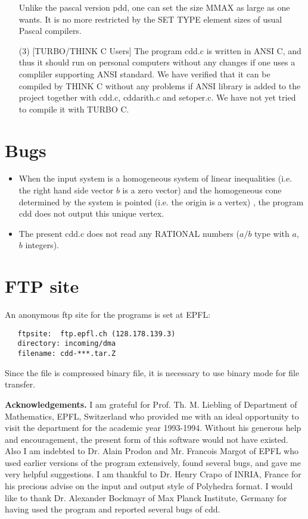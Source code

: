 \begin{itemize}
Unlike the pascal version pdd, one can set the size MMAX as large as one
wants.  It is no more restricted by the SET TYPE element sizes of 
usual Pascal compilers.

\item[(3)] [TURBO/THINK C Users] The program cdd.c is written in
ANSI C, and thus it should run on
personal computers without any changes if one uses a compliler supporting
ANSI standard. We have verified that it can be compiled by THINK C without
any problems if ANSI library is added to the project together with
cdd.c, cddarith.c and setoper.c.  We have not yet tried to compile it with TURBO C.
\end{itemize}

\section{Bugs}  \label{BUGS}
\begin{itemize}

\item When the input system is a homogeneous system of linear inequalities
(i.e. the right hand side vector $b$ is a zero vector) and the homogeneous
cone determined by the system is pointed (i.e. the origin is a vertex) , 
the program cdd does not output this unique vertex.

\item The present cdd.c does not
read any RATIONAL numbers ($a/b$ type with $a$, $b$ integers).

\end{itemize}


\section{FTP site}  \label{FTP}
An anonymous ftp site for the programs is set at EPFL:
\begin{verbatim}
   ftpsite:  ftp.epfl.ch (128.178.139.3)
   directory: incoming/dma
   filename: cdd-***.tar.Z
\end{verbatim}
Since the file is compressed binary file, it is necessary to use binary mode for
file transfer.

\bigskip
\noindent
{\large {\bf Acknowledgements.}} 
I am  grateful for Prof. Th. M. Liebling of
Department of Mathematics, EPFL, Switzerland who
provided me with an ideal opportunity to visit the department
for the academic year 1993-1994.  Without his 
generous help and encouragement,
the present form of this software would not have existed.
Also I am indebted to Dr. Alain Prodon and Mr. Francois Margot
of EPFL who used earlier versions of the program extensively,
found several bugs, and  gave me very helpful suggestions.
I am thankful to Dr. Henry Crapo of INRIA, France for
his precious advise on the input and output style of Polyhedra format.
I would like to thank Dr. Alexander Bockmayr
of Max Planck Institute, Germany for having used the program and
reported several bugs of cdd.

